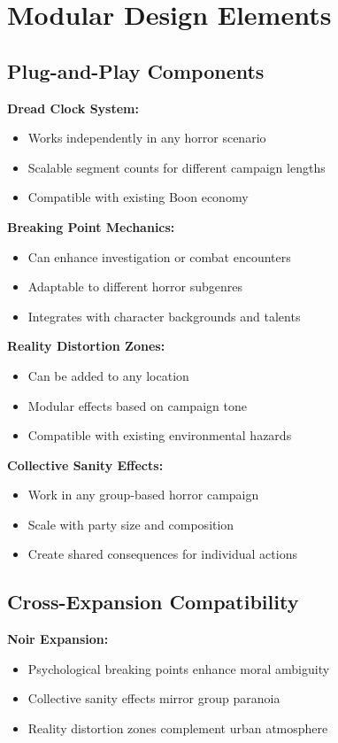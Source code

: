 \documentclass[11pt]{article}
\begin{document}
\section{Modular Design Elements}

\subsection{Plug-and-Play Components}

\textbf{Dread Clock System:}
\begin{itemize}
\item Works independently in any horror scenario
\item Scalable segment counts for different campaign lengths
\item Compatible with existing Boon economy
\end{itemize}

\textbf{Breaking Point Mechanics:}
\begin{itemize}
\item Can enhance investigation or combat encounters
\item Adaptable to different horror subgenres
\item Integrates with character backgrounds and talents
\end{itemize}

\textbf{Reality Distortion Zones:}
\begin{itemize}
\item Can be added to any location
\item Modular effects based on campaign tone
\item Compatible with existing environmental hazards
\end{itemize}

\textbf{Collective Sanity Effects:}
\begin{itemize}
\item Work in any group-based horror campaign
\item Scale with party size and composition
\item Create shared consequences for individual actions
\end{itemize}

\subsection{Cross-Expansion Compatibility}

\textbf{Noir Expansion:}
\begin{itemize}
\item Psychological breaking points enhance moral ambiguity
\item Collective sanity effects mirror group paranoia
\item Reality distortion zones complement urban atmosphere
\end{itemize}
\end{document}
